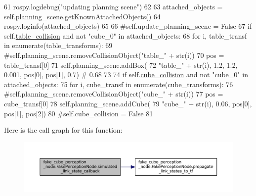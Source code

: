 \begin{DoxyCode}
61             rospy.logdebug(\textcolor{stringliteral}{"updating planning scene"})
62 
63             attached\_objects = self.planning\_scene.getKnownAttachedObjects()
64             rospy.loginfo(attached\_objects)
65 
66             \textcolor{comment}{#self.update\_planning\_scene = False}
67             \textcolor{keywordflow}{if} self.\hyperlink{classfake__cube__perception__node_1_1FakePerceptionNode_a47eafffe4962f50c353a0a2adb9e71be}{table\_collision} \textcolor{keywordflow}{and} \textcolor{keywordflow}{not} \textcolor{stringliteral}{"cube\_0"} \textcolor{keywordflow}{in} attached\_objects:
68                 \textcolor{keywordflow}{for} i, table\_transf \textcolor{keywordflow}{in} enumerate(table\_transforms):
69                     \textcolor{comment}{#self.planning\_scene.removeCollisionObject("table\_" + str(i))}
70                     pos = table\_transf[0]
71                     self.planning\_scene.addBox(
72                         \textcolor{stringliteral}{"table\_"} + str(i), 1.2, 1.2, 0.001, pos[0],  pos[1],  0.7)  \textcolor{comment}{# 0.68}
73 
74             \textcolor{keywordflow}{if} self.\hyperlink{classfake__cube__perception__node_1_1FakePerceptionNode_a5af28c647aa93cf6bb90d4228e27667f}{cube\_collision} \textcolor{keywordflow}{and} \textcolor{keywordflow}{not} \textcolor{stringliteral}{"cube\_0"} \textcolor{keywordflow}{in} attached\_objects:
75                 \textcolor{keywordflow}{for} i, cube\_transf \textcolor{keywordflow}{in} enumerate(cube\_transforms):
76                     \textcolor{comment}{#self.planning\_scene.removeCollisionObject("cube\_" + str(i))}
77                     pos = cube\_transf[0]
78                     self.planning\_scene.addCube(
79                         \textcolor{stringliteral}{"cube\_"} + str(i), 0.06, pos[0],  pos[1],  pos[2])
80                     \textcolor{comment}{#self.cube\_collision = False}
81 
\end{DoxyCode}


Here is the call graph for this function\+:
\nopagebreak
\begin{figure}[H]
\begin{center}
\leavevmode
\includegraphics[width=350pt]{classfake__cube__perception__node_1_1FakePerceptionNode_ac1127eae8d2eda994b22873529bd198f_cgraph}
\end{center}
\end{figure}


